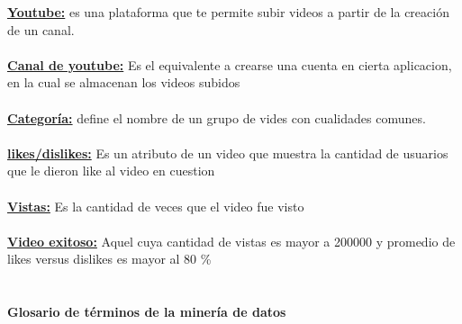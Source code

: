             \underline{\textbf{Youtube:}} es una plataforma que te permite subir videos a
            partir de la creación de un canal.\\\\
            \underline{\textbf{Canal de youtube:}} Es el equivalente a crearse una
            cuenta en cierta aplicacion, en la cual se almacenan los videos subidos\\\\
            \underline{\textbf{Categoría:}} define el nombre de un grupo de vides con
            cualidades comunes.\\\\
            \underline{\textbf{likes/dislikes:}} Es un atributo de un video que muestra la
            cantidad de usuarios que le dieron like al video en cuestion\\\\
            \underline{\textbf{Vistas:}} Es la cantidad de veces que el video fue
            visto\\\\
            \underline{\textbf{Video exitoso:}} Aquel cuya cantidad de vistas es mayor a
            200000 y promedio de likes versus dislikes es mayor al 80 \% \\\\

        \paragraph{Glosario de términos de la minería de datos\\\\}

